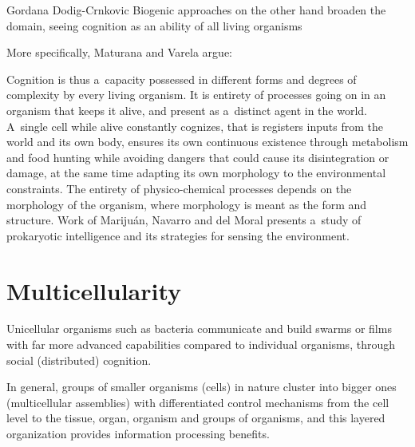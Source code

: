 \begin{artengenv}{Gordana Dodig-Crnkovic}
Biogenic approaches on the other hand broaden the domain, seeing cognition as an ability of all living organisms
\parencites{maturana_biology_1970}{maturana_autopoiesis_1980}{stewart_cognition_1996}

More specifically, Maturana and Varela argue:

Cognition is thus a~capacity possessed in different forms and degrees of complexity by every living organism. It is entirety of processes going on in an organism that keeps it alive, and present as a~distinct agent in the world. A~single cell while alive constantly cognizes, that is registers inputs from the world and its own body, ensures its own continuous existence through metabolism and food hunting while avoiding dangers that could cause its disintegration or damage, at the same time adapting its own morphology to the environmental constraints. The entirety of physico-chemical processes depends on the morphology of the organism, where morphology is meant as the form and structure. Work of Marijuán, Navarro and del Moral
\parencite*{marijuan_prokaryotic_2010}
presents a~study of prokaryotic intelligence and its strategies for sensing the environment.

\section*{Multicellularity}
Unicellular organisms such as bacteria communicate and build swarms or films with far more advanced capabilities compared to individual organisms, through social (distributed) cognition.

In general, groups of smaller organisms (cells) in nature cluster into bigger ones (multicellular assemblies) with differentiated control mechanisms from the cell level to the tissue, organ, organism and groups of organisms, and this layered organization provides information processing benefits.


\end{artengenv}
